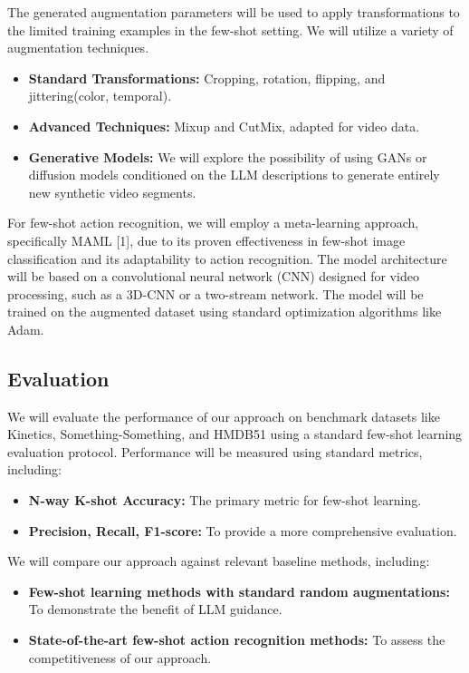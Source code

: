 The generated augmentation parameters will be used to apply transformations to the limited training examples in the few-shot setting. We will utilize a variety of augmentation techniques.

\begin{itemize}[wide, labelindent=20pt] 
    \item \textbf{Standard Transformations:}  Cropping, rotation, flipping, and jittering(color, temporal).
    \item \textbf{Advanced Techniques:} Mixup and CutMix, adapted for video data.
    \item \textbf{Generative Models:} We will explore the possibility of using GANs or diffusion models conditioned on the LLM descriptions to generate entirely new synthetic video segments.
\end{itemize}
For few-shot action recognition, we will employ a meta-learning approach, specifically MAML [1], due to its proven effectiveness in few-shot image classification and its adaptability to action recognition. The model architecture will be based on a convolutional neural network (CNN) designed for video processing, such as a 3D-CNN or a two-stream network. The model will be trained on the augmented dataset using standard optimization algorithms like Adam.

\subsection{ Evaluation}

We will evaluate the performance of our approach on benchmark datasets like Kinetics, Something-Something, and HMDB51 using a standard few-shot learning evaluation protocol. Performance will be measured using standard metrics, including:
\begin{itemize}[wide, labelindent=20pt] 
    \item \textbf{N-way K-shot Accuracy:} The primary metric for few-shot learning.
    \item \textbf{Precision, Recall, F1-score:} To provide a more comprehensive evaluation.
\end{itemize}
We will compare our approach against relevant baseline methods, including:
\begin{itemize}[wide, labelindent=20pt] 
    \item \textbf{Few-shot learning methods with standard random augmentations:} To demonstrate the benefit of LLM guidance.
    \item \textbf{State-of-the-art few-shot action recognition methods:} To assess the competitiveness of our approach.
\end{itemize}

